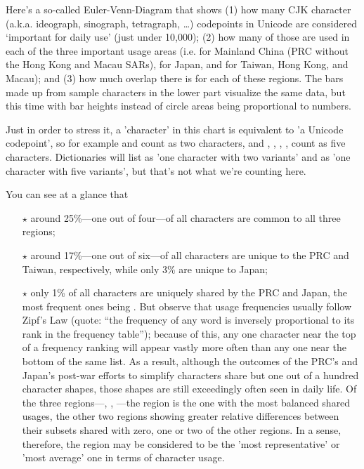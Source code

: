
\begin{multicols}{2}\mktsShowpar\par
Here’s a so-called Euler-Venn-Diagram that shows (1) how many CJK character (a.k.a. ideograph, sinograph, tetragraph, …) codepoints in Unicode are considered ‘important for daily use’ (just under 10,000); (2) how many of those are used in each of the three important usage areas (i.e.  for Mainland China (PRC without the Hong Kong and Macau SARs),  for Japan, and  for Taiwan, Hong Kong, and Macau); and (3) how much overlap there is for each of these regions. The bars made up from sample characters in the lower part visualize the same data, but this time with bar heights instead of circle areas being proportional to numbers.\mktsShowpar\par
Just in order to stress it, a 'character’ in this chart is equivalent to 'a Unicode codepoint’, so for example  and  count as two characters, and , , , ,  count as five characters. Dictionaries will list  as 'one character with two variants’ and  as 'one character with five variants’, but that’s not what we’re counting here.\mktsShowpar\par
You can see at a glance that\mktsShowpar\par
\begin{itemize}\item[$\star$] around 25\%—one out of four—of all characters are common to all three regions;\mktsShowpar\par

\item[$\star$] around 17\%—one out of six—of all characters are unique to the PRC and Taiwan,
respectively, while only 3\% are unique to Japan;\mktsShowpar\par

\item[$\star$] only 1\% of all characters are uniquely shared by the PRC and Japan, the most frequent ones being . But observe that usage frequencies usually follow Zipf’s Law (quote: “the frequency of any word is inversely proportional to its rank in the frequency table”); because of this, any one character near the top of a frequency ranking will appear vastly more often than any one near the bottom of the same list. As a result, although the outcomes of the PRC’s and Japan’s post-war efforts to simplify characters share but one out of a hundred character shapes, those shapes are still exceedingly often seen in daily life.
Of the three regions—, , —the  region is the one with the most balanced shared usages, the other two regions showing greater relative differences between their subsets shared with zero, one or two of the other regions. In a sense, therefore, the  region may be considered to be the 'most representative’ or 'most average’ one in terms of character usage.\mktsShowpar\par



\end{itemize}
\end{multicols}
